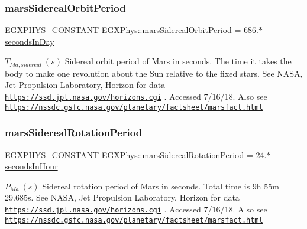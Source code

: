 \subsubsection{\texorpdfstring{mars\+Sidereal\+Orbit\+Period}{marsSiderealOrbitPeriod}}
{\footnotesize\ttfamily \mbox{\hyperlink{group___e_g_x_phys-_constants-_macros_ga76980d288494ce1714c9ac68a95ba702}{E\+G\+X\+P\+H\+Y\+S\+\_\+\+C\+O\+N\+S\+T\+A\+NT}} E\+G\+X\+Phys\+::mars\+Sidereal\+Orbit\+Period = 686.$\ast$\mbox{\hyperlink{namespace_e_g_x_phys_a93d2a00d75411b58cbf63ab3fd1f8bc2}{seconds\+In\+Day}}}

$ T_{Ma,sidereal} \ (s)$ Sidereal orbit period of Mars in seconds. The time it takes the body to make one revolution about the Sun relative to the fixed stars. See N\+A\+SA, Jet Propulsion Laboratory, Horizon for data \href{https://ssd.jpl.nasa.gov/horizons.cgi}{\tt https\+://ssd.\+jpl.\+nasa.\+gov/horizons.\+cgi} . Accessed 7/16/18. Also see \href{https://nssdc.gsfc.nasa.gov/planetary/factsheet/marsfact.html}{\tt https\+://nssdc.\+gsfc.\+nasa.\+gov/planetary/factsheet/marsfact.\+html} \mbox{\label{group___e_g_x_phys-_constants-_astrophysics-_solar_system-_mars-_orbit_ga0bb018bfdf12a530c22d5aa532ae387b}} 
\subsubsection{\texorpdfstring{mars\+Sidereal\+Rotation\+Period}{marsSiderealRotationPeriod}}
{\footnotesize\ttfamily \mbox{\hyperlink{group___e_g_x_phys-_constants-_macros_ga76980d288494ce1714c9ac68a95ba702}{E\+G\+X\+P\+H\+Y\+S\+\_\+\+C\+O\+N\+S\+T\+A\+NT}} E\+G\+X\+Phys\+::mars\+Sidereal\+Rotation\+Period = 24.$\ast$\mbox{\hyperlink{namespace_e_g_x_phys_a7c3165cd93e36f1fb8e9fef80f117bef}{seconds\+In\+Hour}}}

$ P_{Ma} \ (s)$ Sidereal rotation period of Mars in seconds. Total time is 9h 55m 29.\+685s. See N\+A\+SA, Jet Propulsion Laboratory, Horizon for data \href{https://ssd.jpl.nasa.gov/horizons.cgi}{\tt https\+://ssd.\+jpl.\+nasa.\+gov/horizons.\+cgi} . Accessed 7/16/18. Also see \href{https://nssdc.gsfc.nasa.gov/planetary/factsheet/marsfact.html}{\tt https\+://nssdc.\+gsfc.\+nasa.\+gov/planetary/factsheet/marsfact.\+html} \mbox{\label{group___e_g_x_phys-_constants-_astrophysics-_solar_system-_mars-_orbit_ga60cfc74b2c60bd2134f7a500917e3628}} 
